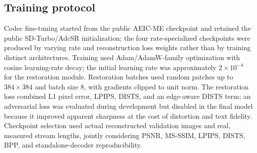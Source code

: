\documentclass[runningheads]{llncs}
\begin{document}
\subsection{Training protocol}
\label{sec:training-protocol}
Codec fine-tuning started from the public AEIC-ME checkpoint and retained the public SD-Turbo/AdcSR initialization; the four rate-specialized checkpoints were produced by varying rate and reconstruction loss weights rather than by training distinct architectures. Training used Adam/AdamW-family optimization with cosine learning-rate decay; the initial learning rate was approximately $2\times10^{-4}$ for the restoration module. Restoration batches used random patches up to $384\times384$ and batch size 8, with gradients clipped to unit norm. The restoration loss combined L1 pixel error, LPIPS, DISTS, and an edge-aware DISTS term; an adversarial loss was evaluated during development but disabled in the final model because it improved apparent sharpness at the cost of distortion and text fidelity. Checkpoint selection used actual reconstructed validation images and real, measured stream lengths, jointly considering PSNR, MS-SSIM, LPIPS, DISTS, BPP, and standalone-decoder reproducibility.
\end{document}
